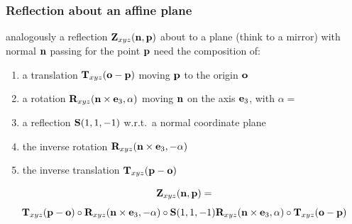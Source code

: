\documentclass{beamer}
\begin{document}
\begin{frame}\frametitle{Reflection about an affine plane}

\vfill

analogously a reflection ${\bf Z}_{xyz}({\bf n},{\bf p})$ about to a plane (think to a mirror) with normal ${\bf n}$ passing for the point ${\bf p}$ need the composition of:

\vfill

\begin{enumerate}

\item a translation ${\bf T}_{xyz}({\bf o}-{\bf p})$ moving ${\bf p}$ to the origin ${\bf o}$

\item\vspace{-2mm} a rotation ${\bf R}_{xyz}({\bf n}\times{\bf e}_3, \alpha)$ moving ${\bf n}$ on the axis ${\bf e}_3$, with $\alpha =$

\item\vspace{-2mm} a reflection ${\bf S}(1,1,-1)$ w.r.t.~a normal coordinate plane

\item\vspace{-2mm} the inverse rotation ${\bf R}_{xyz}({\bf n}\times{\bf e}_3,-\alpha)$

\item\vspace{-2mm} the inverse translation ${\bf T}_{xyz}({\bf p}-{\bf o})$
\end{enumerate}

\vfill

\[
{\bf Z}_{xyz}({\bf n},{\bf p}) =
\]
\[
{\bf T}_{xyz}({\bf p}-{\bf o})\circ {\bf R}_{xyz}({\bf n}\times{\bf e}_3,-\alpha) \circ{\bf S}(1,1,-1) {\bf R}_{xyz}({\bf n}\times{\bf e}_3,\alpha)\circ {\bf T}_{xyz}({\bf o}-{\bf p})
\]


\end{frame}
\end{document}
